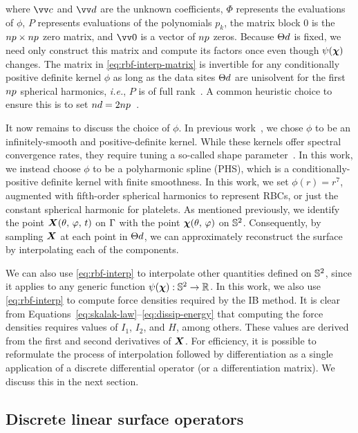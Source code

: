 where $\arr{c}$ and $\arr{d}$ are the unknown coefficients, $\Phi$ represents the evaluations of $\phi$, $P$ represents evaluations of the polynomials $p_k$, the matrix block $0$ is the $\poly\cardinality\times\poly\cardinality$ zero matrix, and $\arr{0}$ is a vector of $\poly\cardinality$ zeros. Because $\data\sites$ is fixed,
we need only construct this matrix and compute its factors once even though $\psi(\boldsymbol{\chi})$ changes. The matrix in \eqref{eq:rbf-interp-matrix} is invertible for any conditionally positive definite kernel $\phi$ as long as the data sites $\data\sites$ are unisolvent for the first $\poly\cardinality$ spherical harmonics, \emph{i.e.}, $P$ is of full rank~\cite{Fasshauer:2007ui}. A common heuristic choice to ensure this is to set $\data\cardinality = 2 \poly\cardinality$~\cite{SWJCP2018}. 

It now remains to discuss the choice of $\phi$. In previous work~\cite{Shankar:2015km}, we chose $\phi$ to be an infinitely-smooth and positive-definite kernel. While these kernels offer spectral convergence rates, they require tuning a so-called shape parameter~\cite{Fasshauer:2007ui}. In this work, we instead choose $\phi$ to be a polyharmonic spline (PHS), which is a conditionally-positive definite kernel with finite smoothness. In this work, we set $\phi(r) = r^7$, augmented with fifth-order spherical harmonics to represent RBCs, or just the constant spherical harmonic for platelets. As mentioned previously, we identify the point $\boldsymbol{X}(\theta,\,\varphi,\,t)$
on $\Gamma$ with the point $\boldsymbol{\chi}(\theta,\,\varphi)$ on $\mathbb{S}^2$. Consequently, by sampling $\boldsymbol{X}$ at each point in $\data\sites$,
we can approximately reconstruct the surface by interpolating each of the components. 

We can also use \eqref{eq:rbf-interp} to interpolate other quantities defined on $\mathbb{S}^2$, since it applies to any generic function $\psi(\boldsymbol{\chi}): \mathbb{S}^2 \to \mathbb{R}$. In this work, we also use \eqref{eq:rbf-interp} to compute force densities required by the IB method. It is clear from Equations~\eqref{eq:skalak-law}--\eqref{eq:dissip-energy} that computing the force densities requires values of $I_1$, $I_2$, and $H$, among others. These values are derived from the first and second derivatives of $\boldsymbol{X}$. For efficiency, it is possible to reformulate the process of interpolation followed by differentiation as a single application of a discrete differential operator (or a differentiation matrix). We discuss this in the next section.

\subsection{Discrete linear surface operators}

